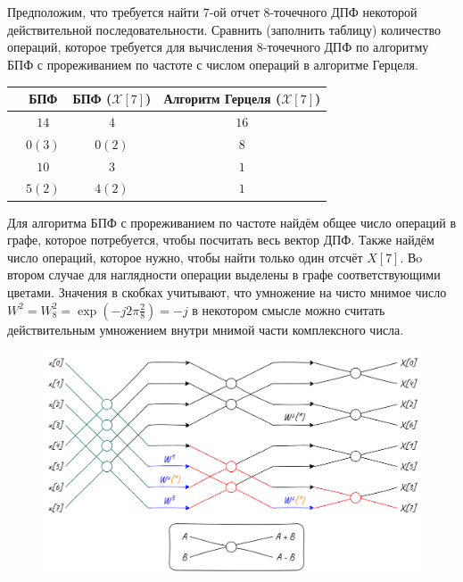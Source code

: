\protect\thispagestyle{fancy}
\section{}
Предположим, что требуется найти $7$-ой отчет $8$-точечного ДПФ некоторой действительной последовательности. 
Сравнить (заполнить таблицу) количество операций, которое требуется для вычисления $8$-точечного ДПФ по алгоритму БПФ с прореживанием по частоте с числом операций в алгоритме Герцеля.


\begin{center}
	\begin{tabular}{||c|| c | c | c||} 
		\hline
		& БПФ & БПФ ($\mathcal{X}[7]$) & Алгоритм Герцеля ($\mathcal{X}[7]$) \\ [0.5ex] 
		\hline\hline
		\color{teal}{Число действительных сложений и вычитаний} & $14$ & $4$ & $16$ \\ 
		\hline
		\color{orange}{Число действительных умножений} & $0(3)$ & $0(2)$ & $8$ \\
		\hline
		\color{red}{Число комплексных сложений и вычитаний} & $10$ & $3$ & $1$ \\
		\hline
		\color{blue}{Число комплексных умножений} & $5(2)$ & $4(2)$ & $1$ \\
		\hline
	\end{tabular}
\end{center}

Для алгоритма БПФ с прореживанием по частоте найдём общее число операций в графе, которое потребуется, чтобы посчитать весь вектор ДПФ. Также найдём число операций, которое нужно, чтобы найти только один отсчёт $X[7]$. Вo втором случае для наглядности операции выделены в графе соответствующими цветами. Значения в скобках учитывают, что умножение на чисто мнимое число $W^2 = W^2_8 = \exp(-j2\pi\frac{2}{8}) = -j$ в некотором смысле можно считать действительным умножением внутри мнимой части комплексного числа.

\begin{figure}[!h]
	\centering
	\includegraphics[width=1.\columnwidth]{pics/spring/4/1.png}
	\label{fig:4-1}
\end{figure}

